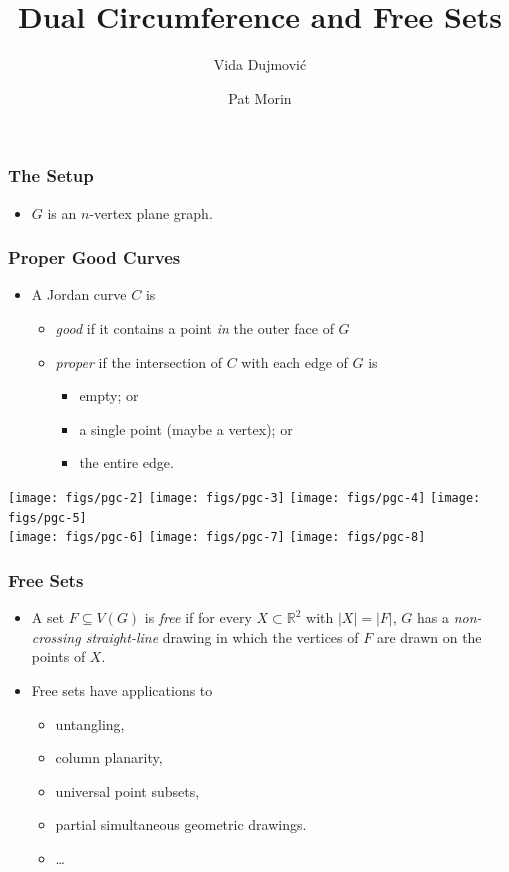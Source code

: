 \documentclass[xcolor=dvipsnames]{beamer}
\title{Dual Circumference and Free Sets}
\author{Vida Dujmović \and Pat Morin}
\newcommand{\R}{\mathbb{R}}
\begin{document}
\begin{frame}
  \titlepage
\end{frame}

\begin{frame}
   \frametitle{The Setup}

   \begin{itemize}
      \item $G$ is an $n$-vertex plane graph.
   \end{itemize}
\end{frame}

\begin{frame}
  \frametitle{Proper Good Curves}
  
  \begin{itemize}
     \item A Jordan curve $C$ is 
     \begin{itemize}
        \item \emph{good} if it contains a point \emph{in} the outer face of $G$
        \item \emph{proper} if the intersection of $C$ with each edge of $G$ is
         \begin{itemize}
            \item empty; or
            \item a single point (maybe a vertex); or
            \item the entire edge.
         \end{itemize}
     \end{itemize}
  \end{itemize}
  \begin{center}
    \texttt{[image: figs/pgc-2]}
    \texttt{[image: figs/pgc-3]}
    \texttt{[image: figs/pgc-4]}
    \texttt{[image: figs/pgc-5]} \\
    \texttt{[image: figs/pgc-6]}
    \texttt{[image: figs/pgc-7]}
    \texttt{[image: figs/pgc-8]}
  \end{center}
\end{frame}

\begin{frame}
  \frametitle{Free Sets}

   \begin{itemize}[<+->]
     \item A set $F\subseteq V(G)$ is \emph{free} if for every
     $X\subset\R^2$ with $|X|=|F|$, $G$ has a \emph{non-crossing
     straight-line} drawing in which the vertices of $F$ are drawn on
     the points of $X$.

     \item Free sets have applications to
     \begin{itemize}
        \item untangling, 
        \item column planarity, 
        \item universal point subsets, 
        \item partial simultaneous geometric drawings.
        \item \ldots
     \end{itemize}
   \end{itemize}
\end{frame}
\end{document}

